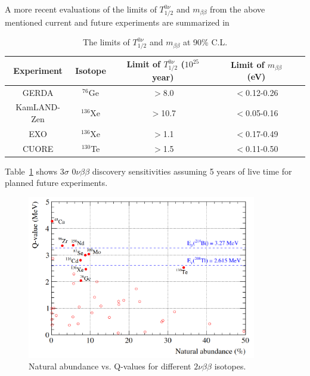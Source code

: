A more recent evaluations of the limits of $T^{0\nu}_{1/2}$ and $m_{\beta\beta}$ from the above mentioned
current and future experiments are summarized in

\begin{table}[ht]
	\centering
	\caption{\label{gerdatable} The limits of $T^{0\nu}_{1/2}$ and $m_{\beta\beta}$ at 90\% C.L.}	
	{
		\begin{tabular*}{135mm}{c@{\extracolsep{\fill}}cccc}
			\toprule 
			Experiment & Isotope & Limit of $T^{0\nu}_{1/2}$ ($10^{25}$ year) & Limit of $m_{\beta\beta}$ (eV)\\
			\midrule
			GERDA       & $^{76}$Ge & $>$8.0 & $<$0.12-0.26  \\	
			KamLAND-Zen & $^{136}$Xe & $>$10.7 & $<$0.05-0.16	\\
			EXO         & $^{136}$Xe & $>$1.1 & $<$0.17-0.49  \\	
			CUORE       & $^{130}$Te & $>$1.5 &  $<$0.11-0.50 \\	
			\bottomrule	
		\end{tabular*}
	}
\end{table}
\vspace{1cm}

Table~\ref{gerdatable}\cite{agostini2017discovery,agostini2019probing} shows 3$\sigma$ $0\nu\beta\beta$ discovery sensitivities assuming 5 years of live time for planned future experiments.%

\begin{figure}[!htb]
	\centering
	\includegraphics[width=10cm]{Te_abundance.png}
	\caption{Natural abundance vs. Q-values for different $2\nu\beta\beta$ isotopes\cite{snop_nim}.}
	\label{te_abundance}
\end{figure}


